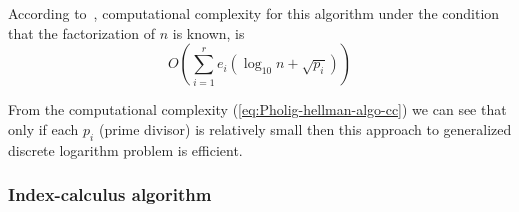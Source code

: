 \documentclass[12pt,journal,compsoc]{IEEEtran}
\begin{document}
\par
According to~\cite{ref:menezes2010handbook}, computational complexity
for this algorithm under the condition that the factorization of $n$
is known, is
\begin{equation}
  \label{eq:Pholig-hellman-algo-cc}
  O(\sum_{i=1}^{r}e_{i}(\log_{10}n+\sqrt{p_{i}}))
\end{equation}

\par
From the computational complexity
(\autoref{eq:Pholig-hellman-algo-cc}) we can see that only if each
$p_{i}$ (prime divisor) is relatively small then this approach to
generalized discrete logarithm problem is efficient.

\subsubsection{\qquad Index-calculus algorithm}
\label{sec:qquad-index-calculus}
\end{document}
